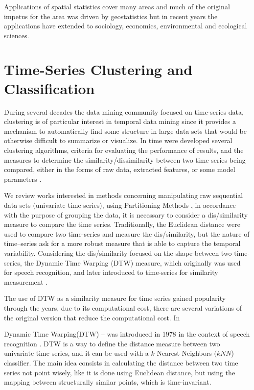 Applications of spatial statistics cover many areas and much of the original impetus for the area was driven by geostatistics but in recent years the applications have extended to sociology, economics, environmental and ecological sciences.

\section{Time-Series Clustering and Classification}
\label{Sec:ClusteringRelatedWorks}

During several decades the data mining community focused on time-series data, clustering is of particular interest in temporal data mining since it provides a mechanism to automatically find some structure in large data sets that would be otherwise difficult to summarize or visualize. In time were developed several clustering algorithms, criteria for evaluating the performance of results, and the measures to determine the similarity/dissimilarity between two time series being compared, either in the forms of raw data, extracted features, or some model parameters \cite{Liao2005, Aghabozorgi2015}.

We review works interested in methods concerning manipulating raw sequential data sets (univariate time series), using Partitioning Methods \cite{Kaufman2009}, in accordance with the purpose of grouping the data, it is necessary to consider a dis/similarity measure to compare the time series. Traditionally, the Euclidean distance were used to compare two time-series and measure the dis/similarity, but the nature of time--series ask for a more robust measure that is able to capture the temporal variability. Considering the dis/similarity focused on the shape between two time-series, the Dynamic Time Warping (DTW) measure, which originally was used for speech recognition, and later introduced to time-series for similarity measurement \cite{Sakoe1978}.

The use of DTW as a similarity measure for time series gained popularity through the years, due to its computational cost, there are several variations of the original version that reduce the computational cost. In 

Dynamic  Time  Warping(DTW) – was introduced in 1978 in the context of speech recognition \cite{Sakoe1978}. DTW is a way to define the distance measure between two univariate time series, and it can be used with a $k$-Nearest Neighbors ($kNN$) classifier. The main idea consists in calculating the distance between two time series not point wisely, like it is done using Euclidean distance, but using the mapping between structurally similar points, which is time-invariant.

